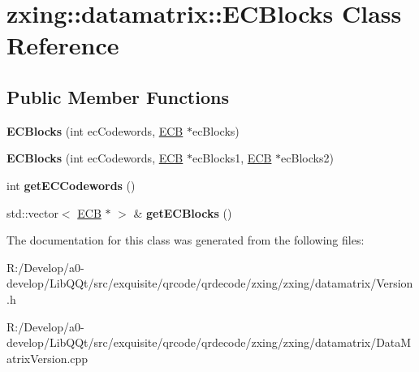 \hypertarget{classzxing_1_1datamatrix_1_1_e_c_blocks}{}\section{zxing\+:\+:datamatrix\+:\+:E\+C\+Blocks Class Reference}
\label{classzxing_1_1datamatrix_1_1_e_c_blocks}
\subsection*{Public Member Functions}
\begin{DoxyCompactItemize}
\item 
\mbox{\label{classzxing_1_1datamatrix_1_1_e_c_blocks_a5e69d3e34f8f18f67c82e4e8c6e97987}} 
{\bfseries E\+C\+Blocks} (int ec\+Codewords, \mbox{\hyperlink{classzxing_1_1datamatrix_1_1_e_c_b}{E\+CB}} $\ast$ec\+Blocks)
\item 
\mbox{\label{classzxing_1_1datamatrix_1_1_e_c_blocks_ae730790e387be84adebf78819205e0bf}} 
{\bfseries E\+C\+Blocks} (int ec\+Codewords, \mbox{\hyperlink{classzxing_1_1datamatrix_1_1_e_c_b}{E\+CB}} $\ast$ec\+Blocks1, \mbox{\hyperlink{classzxing_1_1datamatrix_1_1_e_c_b}{E\+CB}} $\ast$ec\+Blocks2)
\item 
\mbox{\label{classzxing_1_1datamatrix_1_1_e_c_blocks_af337b3c9ae8f02a76814f3ba9a0b52df}} 
int {\bfseries get\+E\+C\+Codewords} ()
\item 
\mbox{\label{classzxing_1_1datamatrix_1_1_e_c_blocks_aced0eecb8891483309242e798046c8ab}} 
std\+::vector$<$ \mbox{\hyperlink{classzxing_1_1datamatrix_1_1_e_c_b}{E\+CB}} $\ast$ $>$ \& {\bfseries get\+E\+C\+Blocks} ()
\end{DoxyCompactItemize}


The documentation for this class was generated from the following files\+:\begin{DoxyCompactItemize}
\item 
R\+:/\+Develop/a0-\/develop/\+Lib\+Q\+Qt/src/exquisite/qrcode/qrdecode/zxing/zxing/datamatrix/Version.\+h\item 
R\+:/\+Develop/a0-\/develop/\+Lib\+Q\+Qt/src/exquisite/qrcode/qrdecode/zxing/zxing/datamatrix/Data\+Matrix\+Version.\+cpp\end{DoxyCompactItemize}
